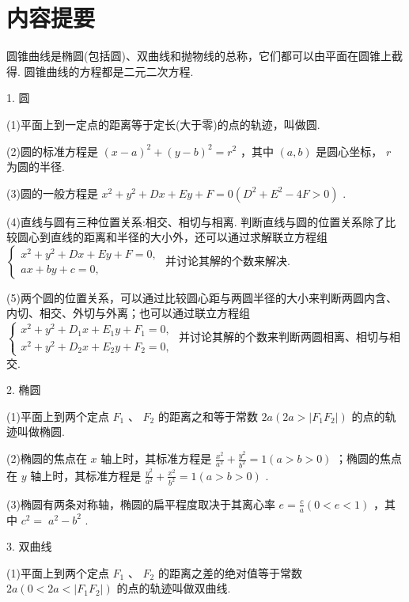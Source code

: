 \documentclass[10pt]{article}
\begin{document}
\section*{内容提要}

圆锥曲线是椭圆(包括圆)、双曲线和抛物线的总称，它们都可以由平面在圆锥上截得. 圆锥曲线的方程都是二元二次方程.

1. 圆

(1)平面上到一定点的距离等于定长(大于零)的点的轨迹，叫做圆.

(2)圆的标准方程是 \({\left( x - a\right) }^{2} + {\left( y - b\right) }^{2} = {r}^{2}\) ，其中 \(\left( {a,b}\right)\) 是圆心坐标， \(r\) 为圆的半径.

(3)圆的一般方程是 \({x}^{2} + {y}^{2} + {Dx} + {Ey} + F = 0\left( {{D}^{2} + {E}^{2} - {4F} > 0}\right)\) .

(4)直线与圆有三种位置关系:相交、相切与相离. 判断直线与圆的位置关系除了比较圆心到直线的距离和半径的大小外，还可以通过求解联立方程组 \(\left\{  \begin{array}{l} {x}^{2} + {y}^{2} + {Dx} + {Ey} + F = 0, \\  {ax} + {by} + c = 0, \end{array}\right.\) 并讨论其解的个数来解决.

(5)两个圆的位置关系，可以通过比较圆心距与两圆半径的大小来判断两圆内含、内切、相交、外切与外离；也可以通过联立方程组 \(\left\{  \begin{array}{l} {x}^{2} + {y}^{2} + {D}_{1}x + {E}_{1}y + {F}_{1} = 0, \\  {x}^{2} + {y}^{2} + {D}_{2}x + {E}_{2}y + {F}_{2} = 0, \end{array}\right.\) 并讨论其解的个数来判断两圆相离、相切与相交.

2. 椭圆

(1)平面上到两个定点 \({F}_{1}\text{ 、 }{F}_{2}\) 的距离之和等于常数 \({2a}\left( {{2a} > \left| {{F}_{1}{F}_{2}}\right| }\right)\) 的点的轨迹叫做椭圆.

(2)椭圆的焦点在 \(x\) 轴上时，其标准方程是 \(\frac{{x}^{2}}{{a}^{2}} + \frac{{y}^{2}}{{b}^{2}} = 1\left( {a > b > 0}\right)\) ；椭圆的焦点在 \(y\) 轴上时，其标准方程是 \(\frac{{y}^{2}}{{a}^{2}} + \frac{{x}^{2}}{{b}^{2}} = 1\left( {a > b > 0}\right)\) .

(3)椭圆有两条对称轴，椭圆的扁平程度取决于其离心率 \(e = \frac{c}{a}\left( {0 < e < 1}\right)\) ，其中 \({c}^{2} = \; {a}^{2} - {b}^{2}\) .

3. 双曲线

(1)平面上到两个定点 \({F}_{1}\text{ 、 }{F}_{2}\) 的距离之差的绝对值等于常数 \({2a}\left( {0 < {2a} < \left| {{F}_{1}{F}_{2}}\right| }\right)\) 的点的轨迹叫做双曲线.
\end{document}
